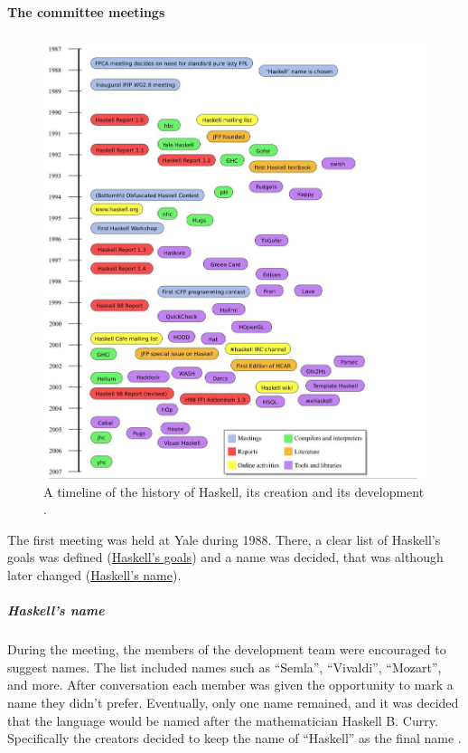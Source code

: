 \documentclass[a4paper, titlepage, twoside]{article}
\begin{document}
\paragraph*{The committee meetings}
\label{sec:org6d5735b}

\begin{figure}[htbp]
\centering
\includegraphics[width=.9\linewidth]{img/2023-05-18_12-50-04_screenshot.png}
\caption{A timeline of the history of Haskell, its creation and its development \autocite{hudakHistoryHaskellBeing2007}.}
\end{figure}

The first meeting was held at Yale during 1988. There, a clear list of Haskell's goals was defined (\hyperref[sec:org05d13b0]{Haskell's goals}) and a name was decided, that was although later changed (\hyperref[sec:orge0a5ef0]{Haskell's name}).

\subparagraph*{Haskell's name}
\label{sec:orge0a5ef0}

During the meeting, the members of the development team were encouraged to suggest names. The list included names such as ``Semla'', ``Vivaldi'', ``Mozart'', and more. After conversation each member was given the opportunity to mark a name they didn't prefer. Eventually, only one name remained, and it was decided that the language would be named after the mathematician Haskell B. Curry. Specifically the creators decided to keep the name of ``Haskell'' as the final name \autocite{hudakHistoryHaskellBeing2007}.
\end{document}
